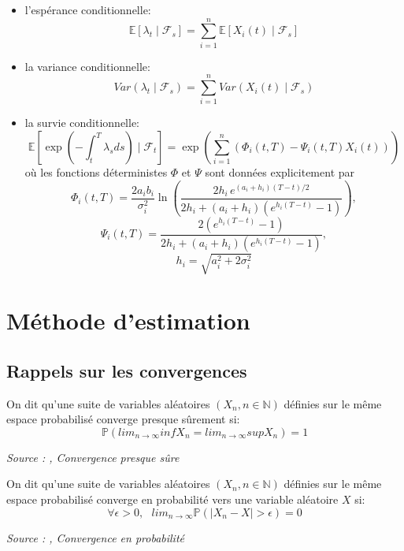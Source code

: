 \begin{itemize}
    \item l'espérance conditionnelle: $$\mathbb{E}[\lambda_t \mid \mathcal{F}_s] = \sum_{i = 1}^n \mathbb{E}[X_i(t) \mid \mathcal{F}_s]$$
    \item la variance conditionnelle: $$Var(\lambda_t \mid \mathcal{F}_s) = \sum_{i = 1}^n Var(X_i(t) \mid \mathcal{F}_s)$$
    \item la survie conditionnelle: $$\mathbb{E} [\exp(-\int_t^T \lambda_s ds) \mid \mathcal{F}_t] = \exp\left( \sum_{i = 1}^n \left( \Phi_i(t, T) - \Psi_i(t, T)X_i(t) \right) \right)$$ où les fonctions déterministes $\Phi$ et $\Psi$ sont données explicitement par
    \[
    \Phi_i(t,T) = \frac{2a_ib_i}{\sigma_i^2}\ln\left(\frac{2h_i \, e^{(a_i+h_i)(T-t)/2}}{2h_i + (a_i+h_i)\left(e^{h_i(T-t)}-1\right)}\right),
    \]
    \[\Psi_i(t,T) = \frac{2\left(e^{h_i(T-t)}-1\right)}{2h_i + (a_i+h_i)\left(e^{h_i(T-t)}-1\right)},
    \]
    \[
    h_i = \sqrt{a_i^2 + 2\sigma_i^2}
    \]
\end{itemize}


\chapter{Méthode d'estimation}


\section{Rappels sur les convergences}

\begin{definition}\label{def:convergence_ps}
On dit qu'une suite de variables aléatoires $(X_n, n\in \mathbb{N})$ définies sur le même espace probabilisé converge presque sûrement si:
$$\mathbb{P}(lim_{n \rightarrow \infty} inf X_n = lim_{n \rightarrow \infty} sup X_n) = 1$$

\noindent\textit{Source : \cite{ensta_cours}, Convergence presque sûre}
\end{definition}

\begin{definition}\label{def:convergence_proba}
On dit qu'une suite de variables aléatoires $(X_n, n\in \mathbb{N})$ définies sur le même espace probabilisé converge en probabilité vers une variable aléatoire $X$ si:
$$\forall \epsilon > 0, \text{ } lim_{n \rightarrow \infty} \mathbb{P}(|X_n -X| > \epsilon) = 0$$

\noindent\textit{Source : \cite{ensta_cours}, Convergence en probabilité}
\end{definition}

